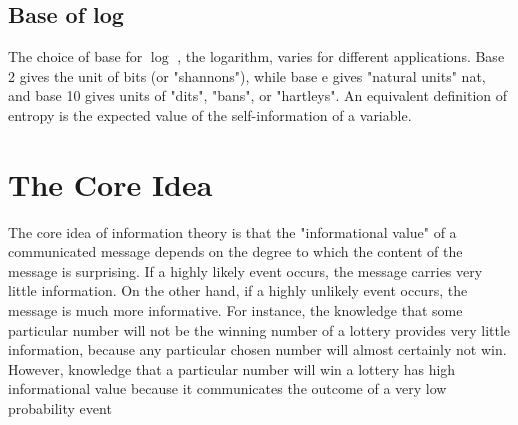 \documentclass{article}
\begin{document}
\subsection{Base of log}

The choice of base for $\log$ , the logarithm, varies for different applications. Base 2 gives the unit of bits (or "shannons"), while base e gives "natural units" nat, and base 10 gives units of "dits", "bans", or "hartleys". An equivalent definition of entropy is the expected value of the self-information of a variable.

\section{The Core Idea}

The core idea of information theory is that the "informational value" of a communicated message depends on the degree to which the content of the message is surprising. If a highly likely event occurs, the message carries very little information. On the other hand, if a highly unlikely event occurs, the message is much more informative. For instance, the knowledge that some particular number will not be the winning number of a lottery provides very little information, because any particular chosen number will almost certainly not win. However, knowledge that a particular number will win a lottery has high informational value because it communicates the outcome of a very low probability event
\end{document}
